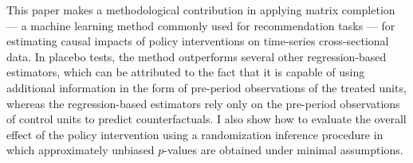 \documentclass[hidelinks,12pt]{article}
\begin{document}
This paper makes a methodological contribution in applying matrix completion --- a machine learning method commonly used for recommendation tasks --- for estimating causal impacts of policy interventions on time-series cross-sectional data. In placebo tests, the method outperforms several other regression-based estimators, which can be attributed to the fact that it is capable of using additional information in the form of pre-period observations of the treated units, whereas the regression-based estimators rely only on the pre-period observations of control units to predict counterfactuals. I also show how to evaluate the overall effect of the policy intervention using a randomization inference procedure in which approximately unbiased $p$-values are obtained under minimal assumptions. 

\newpage


\begin{singlespace}
\begin{footnotesize}
\begin{multicols}{2}

\end{multicols}
\end{footnotesize}
\end{singlespace}

\itemize
\end{document}
